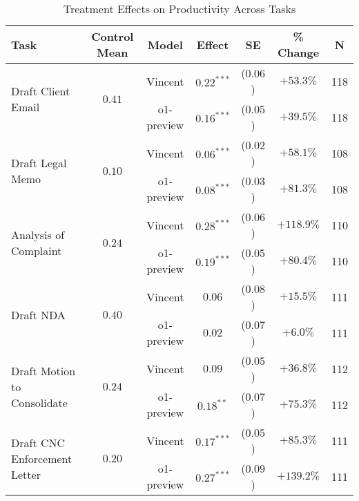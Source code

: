 \begin{table}[!htbp]
\centering
\caption{Treatment Effects on Productivity Across Tasks}
\label{tab:productivity_effects_controls}
\vspace{0.3cm}
\begin{tabular}{lcccccc}
\hline\hline
Task & Control Mean & Model & Effect & SE & \% Change & N \\
\hline
\multirow{2}{*}{Draft Client Email} & \multirow{2}{*}{$0.41$} & Vincent & $0.22^{***}$ & ($0.06$) & $+53.3\%$ & 118 \\
& & o1-preview & $0.16^{***}$ & ($0.05$) & $+39.5\%$ & 118 \\
\hline
\multirow{2}{*}{Draft Legal Memo} & \multirow{2}{*}{$0.10$} & Vincent & $0.06^{***}$ & ($0.02$) & $+58.1\%$ & 108 \\
& & o1-preview & $0.08^{***}$ & ($0.03$) & $+81.3\%$ & 108 \\
\hline
\multirow{2}{*}{Analysis of Complaint} & \multirow{2}{*}{$0.24$} & Vincent & $0.28^{***}$ & ($0.06$) & $+118.9\%$ & 110 \\
& & o1-preview & $0.19^{***}$ & ($0.05$) & $+80.4\%$ & 110 \\
\hline
\multirow{2}{*}{Draft NDA} & \multirow{2}{*}{$0.40$} & Vincent & $0.06$ & ($0.08$) & $+15.5\%$ & 111 \\
& & o1-preview & $0.02$ & ($0.07$) & $+6.0\%$ & 111 \\
\hline
\multirow{2}{*}{Draft Motion to Consolidate} & \multirow{2}{*}{$0.24$} & Vincent & $0.09$ & ($0.05$) & $+36.8\%$ & 112 \\
& & o1-preview & $0.18^{**}$ & ($0.07$) & $+75.3\%$ & 112 \\
\hline
\multirow{2}{*}{Draft CNC Enforcement Letter} & \multirow{2}{*}{$0.20$} & Vincent & $0.17^{***}$ & ($0.05$) & $+85.3\%$ & 111 \\
& & o1-preview & $0.27^{***}$ & ($0.09$) & $+139.2\%$ & 111 \\
\hline
\hline\hline
\end{tabular}

\vspace{0.5cm}


\end{table}
